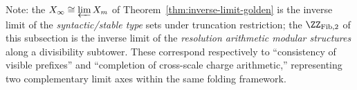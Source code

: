 \begin{remark}[Relation to \texorpdfstring{$X_\infty\cong\varprojlim X_m$}{X-infty = lim X\_m}]\label{rem:fib-adic-vs-syntax}
Note: the $X_\infty\cong\varprojlim X_m$ of Theorem~\ref{thm:inverse-limit-golden} is the inverse limit of the \emph{syntactic/stable type} sets under truncation restriction;
the $\ZZ_{\mathrm{Fib},2}$ of this subsection is the inverse limit of the \emph{resolution arithmetic modular structures} along a divisibility subtower.
These correspond respectively to ``consistency of visible prefixes'' and ``completion of cross-scale charge arithmetic,'' representing two complementary limit axes within the same folding framework.
\end{remark}
